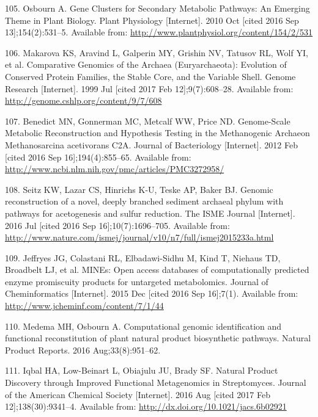 \documentclass[12pt,twoside]{reedthesis}
\begin{document}
  \hypertarget{ref-osbourn_gene_2010}{}
  105. Osbourn A. Gene Clusters for Secondary Metabolic Pathways: An
  Emerging Theme in Plant Biology. Plant Physiology {[}Internet{]}. 2010
  Oct {[}cited 2016 Sep 13{]};154(2):531--5. Available from:
  \url{http://www.plantphysiol.org/content/154/2/531}
  
  \hypertarget{ref-makarova_comparative_1999}{}
  106. Makarova KS, Aravind L, Galperin MY, Grishin NV, Tatusov RL, Wolf
  YI, et al. Comparative Genomics of the Archaea (Euryarchaeota):
  Evolution of Conserved Protein Families, the Stable Core, and the
  Variable Shell. Genome Research {[}Internet{]}. 1999 Jul {[}cited 2017
  Feb 12{]};9(7):608--28. Available from:
  \url{http://genome.cshlp.org/content/9/7/608}
  
  \hypertarget{ref-benedict_genome-scale_2012}{}
  107. Benedict MN, Gonnerman MC, Metcalf WW, Price ND. Genome-Scale
  Metabolic Reconstruction and Hypothesis Testing in the Methanogenic
  Archaeon Methanosarcina acetivorans C2A. Journal of Bacteriology
  {[}Internet{]}. 2012 Feb {[}cited 2016 Sep 16{]};194(4):855--65.
  Available from:
  \url{http://www.ncbi.nlm.nih.gov/pmc/articles/PMC3272958/}
  
  \hypertarget{ref-seitz_genomic_2016}{}
  108. Seitz KW, Lazar CS, Hinrichs K-U, Teske AP, Baker BJ. Genomic
  reconstruction of a novel, deeply branched sediment archaeal phylum with
  pathways for acetogenesis and sulfur reduction. The ISME Journal
  {[}Internet{]}. 2016 Jul {[}cited 2016 Sep 16{]};10(7):1696--705.
  Available from:
  \url{http://www.nature.com/ismej/journal/v10/n7/full/ismej2015233a.html}
  
  \hypertarget{ref-jeffryes_mines_2015}{}
  109. Jeffryes JG, Colastani RL, Elbadawi-Sidhu M, Kind T, Niehaus TD,
  Broadbelt LJ, et al. MINEs: Open access databases of computationally
  predicted enzyme promiscuity products for untargeted metabolomics.
  Journal of Cheminformatics {[}Internet{]}. 2015 Dec {[}cited 2016 Sep
  16{]};7(1). Available from: \url{http://www.jcheminf.com/content/7/1/44}
  
  \hypertarget{ref-medema_computational_2016}{}
  110. Medema MH, Osbourn A. Computational genomic identification and
  functional reconstitution of plant natural product biosynthetic
  pathways. Natural Product Reports. 2016 Aug;33(8):951--62.
  
  \hypertarget{ref-iqbal_natural_2016}{}
  111. Iqbal HA, Low-Beinart L, Obiajulu JU, Brady SF. Natural Product
  Discovery through Improved Functional Metagenomics in Streptomyces.
  Journal of the American Chemical Society {[}Internet{]}. 2016 Aug
  {[}cited 2017 Feb 12{]};138(30):9341--4. Available from:
  \url{http://dx.doi.org/10.1021/jacs.6b02921}
  
\end{document}

